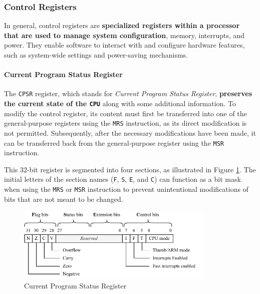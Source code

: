 \documentclass[english, ing, kiv, he, iso690numb, pdf]{fasthesis}
\begin{document}
	\subsubsection{Control Registers}
	
	In general, control registers are \textbf{specialized registers within a processor that are used to manage system configuration}, memory, interrupts, and power. They enable software to interact with and configure hardware features, such as system-wide settings and power-saving mechanisms.
	
	\paragraph{Current Program Status Register}
	
	The \texttt{CPSR} register, which stands for \textit{Current Program Status Register}, \textbf{preserves the current state of the \texttt{CPU}} along with some additional information. To modify the control register, its content must first be transferred into one of the general-purpose registers using the \texttt{MRS} instruction, as its direct modification is not permitted. Subsequently, after the necessary modifications have been made, it can be transferred back from the general-purpose register using the \texttt{MSR} instruction.
	
	This 32-bit register is segmented into four sections, as illustrated in Figure \ref{Current Program Status Register}. The initial letters of the section names (\texttt{F}, \texttt{S}, \texttt{E}, and \texttt{C}) can function as a bit mask when using the \texttt{MRS} or \texttt{MSR} instruction to prevent unintentional modifications of bits that are not meant to be changed.
	
	\begin{figure}[ht]
		\centering
		\includegraphics[width=0.85\textwidth]{img/diagrams/cpsr.pdf}
		\caption{Current Program Status Register\protect\footnotemark}
		\label{Current Program Status Register}
	\end{figure}
	
	
\end{document}
